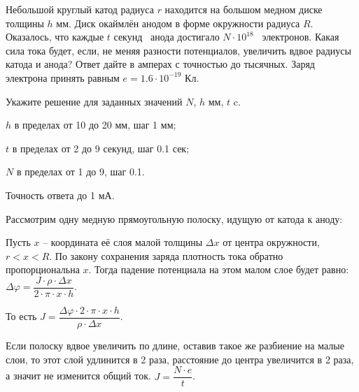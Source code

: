 
Небольшой круглый катод радиуса $r$ находится на большом медном диске толщины $h$ мм. Диск окаймлён анодом в форме окружности радиуса
$R$. Оказалось, что каждые $t$ секунд  анода достигало $N \cdot 10^{18}$  электронов. Какая сила тока будет, если, не
меняя разности потенциалов, увеличить вдвое радиусы катода и анода? Ответ дайте в амперах с точностью до тысячных. Заряд электрона
принять равным \linebreak $e = 1.6 \cdot 10^{-19}$ Кл.

Укажите решение для заданных значений $N$, $h$ мм, $t$ c.

\paramSection

$h$ в пределах от 10 до 20 мм, шаг  1 мм;   

$t$ в пределах от 2 до 9 секунд, шаг 0.1 сек;

$N$ в пределах от 1 до 9, шаг 0.1.

Точность ответа  до  1 мА.

\solutionSection

Рассмотрим одну медную прямоугольную полоску, идущую от катода к аноду:


Пусть $x$ –  координата её слоя малой толщины $\Delta x$ от центра окружности, \linebreak $r<x<R$. По закону 
сохранения заряда плотность тока обратно пропорциональна $x$. Тогда падение потенциала на этом малом 
слое будет равно: $\Delta \varphi=\dfrac{J \cdot \rho  \cdot \Delta x}{2 \cdot \pi \cdot x \cdot h}$.  

То есть $J=\dfrac{\Delta \varphi \cdot 2 \cdot \pi \cdot x \cdot h}{\rho  \cdot \Delta x}$.

Если полоску вдвое увеличить по длине, оставив такое же разбиение на малые слои, то этот слой удлинится 
в 2 раза, расстояние до центра увеличится в 2 раза, а значит не изменится общий ток. $J = \dfrac{N \cdot e}{t}$.

